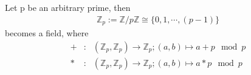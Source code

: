 \documentclass[10pt]{article}
\begin{document}
Let p be an arbitrary prime, then
\begin{eqnarray} \nonumber
\mathbb{Z}_p := \mathbb{Z} / p\mathbb{Z} \cong \{0,1, \cdots,(p-1)\} 
\end{eqnarray}
becomes a field, where
\begin{eqnarray} \nonumber
+ &:& (\mathbb{Z}_p,\mathbb{Z}_p) \to \mathbb{Z}_p; (a,b) \mapsto a+p \mod p \\
\nonumber
* &:& (\mathbb{Z}_p,\mathbb{Z}_p) \to \mathbb{Z}_p; (a,b) \mapsto a*p \mod p
\end{eqnarray}
\end{document}
